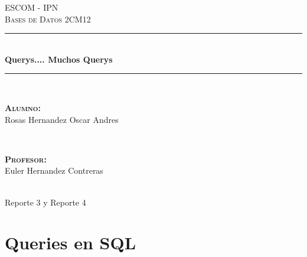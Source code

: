 \documentclass[12pt, fleqn]{article}                             %
\author{Oscar Andrés Rosas}                                     %
\begin{document}
\begin{titlepage}

    \center
    \textsc{\Large ESCOM - IPN}\\[0.5cm] 
    \textsc{\large Bases de Datos 2CM12}\\[1.5cm]

    \rule{\linewidth}{0.5mm} \\[1.0cm]
        { \huge \bfseries Querys.... Muchos Querys}\\[1.0cm] 
    \rule{\linewidth}{0.5mm} \\[2.0cm]
     
    \begin{minipage}{0.4\textwidth}
        \begin{flushleft} \large
            \textbf{\textsc{Alumno:}}\\
            Rosas Hernandez Oscar Andres
        \end{flushleft}
    \end{minipage}
    ~
    \begin{minipage}{0.4\textwidth}
        \begin{flushright} \large
            \textbf{\textsc{Profesor: }}\\
            Euler Hernandez Contreras
        \end{flushright}
    \end{minipage}\\[3,5cm]

    {\LARGE Reporte 3 y Reporte 4}\\[4cm] 
    
    
    \vfill

\end{titlepage}









\section{Queries en SQL}
\end{document}
